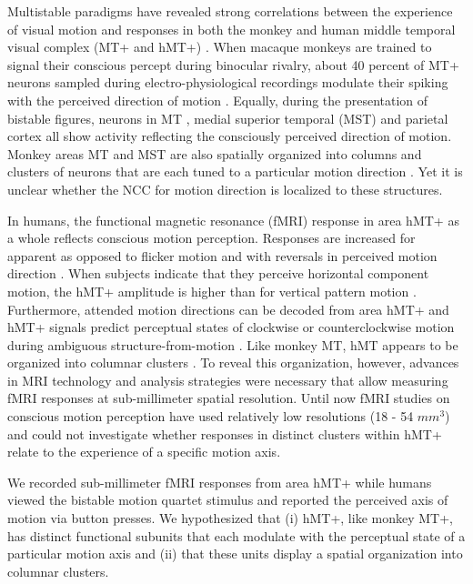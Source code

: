 Multistable paradigms have revealed strong correlations between the experience of visual motion and responses in both the monkey and human middle temporal visual complex (MT+ and hMT+) \parencite{Leopold1999, Rees2007, Sterzer2009}. When macaque monkeys are trained to signal their conscious percept during binocular rivalry, about 40 percent of MT+ neurons sampled during electro-physiological recordings modulate their spiking with the perceived direction of motion \parencite{Logothetis1989, Leopold1999}. Equally, during the presentation of bistable figures, neurons in MT \parencite{Dodd2001}, medial superior temporal (MST) and parietal cortex \parencite{Williams2003} all show activity reflecting the consciously perceived direction of motion. Monkey areas MT and MST are also spatially organized into columns and clusters of neurons that are each tuned to a particular motion direction \parencite{Albright1984, Salzman1990, Britten1998}. Yet it is unclear whether the NCC for motion direction is localized to these structures.

In humans, the functional magnetic resonance (fMRI) response in area hMT+ as a whole reflects conscious motion perception. Responses are increased for apparent as opposed to flicker motion \parencite{Muckli2002} and with reversals in perceived motion direction \parencite{Sterzer2002}. When subjects indicate that they perceive horizontal component motion, the hMT+ amplitude is higher than for vertical pattern motion \parencite{Castelo-Branco2002}. Furthermore, attended motion directions can be decoded from area hMT+ \parencite{Kamitani2006} and hMT+ signals predict perceptual states of clockwise or counterclockwise motion during ambiguous structure-from-motion \parencite{Brouwer2007}. Like monkey MT, hMT appears to be organized into columnar clusters \parencite{Zimmermann2011}. To reveal this organization, however, advances in MRI technology \parencite{Ugurbil2003} and analysis strategies \parencite{Kemper2017,Polimeni2017} were necessary that allow measuring fMRI responses at sub-millimeter spatial resolution. Until now fMRI studies on conscious motion perception have used relatively low resolutions (18 - 54 $mm^3$) and could not investigate whether responses in distinct clusters within hMT+ relate to the experience of a specific motion axis.

We recorded sub-millimeter fMRI responses from area hMT+ while humans viewed the bistable motion quartet stimulus and reported the perceived axis of motion via button presses. We hypothesized that (i) hMT+, like monkey MT+, has distinct functional subunits that each modulate with the perceptual state of a particular motion axis and (ii) that these units display a spatial organization into columnar clusters.

